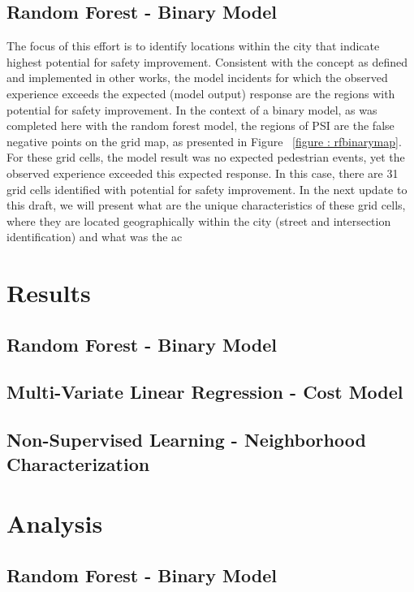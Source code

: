 \documentclass{llncs}
\begin{document}
\subsection{Random Forest - Binary Model}

The focus of this effort is to identify locations within the city that indicate highest potential for safety improvement. Consistent with the concept as defined and implemented in other works, the model incidents for which the observed experience exceeds the expected (model output) response are the regions with potential for safety improvement. In the context of a binary model, as was completed here with the random forest model, the regions of PSI are the false negative points on the grid map, as presented in Figure ~\ref{figure : rfbinarymap}. For these grid cells, the model result was no expected pedestrian events, yet the observed experience exceeded this expected response. In this case, there are 31 grid cells identified with potential for safety improvement. In the next update to this draft, we will present what are the unique characteristics of these grid cells, where they are located geographically within the city (street and intersection identification) and what was the ac
%
\section{Results}
%

\subsection{Random Forest - Binary Model}

\subsection{Multi-Variate Linear Regression - Cost Model}

\subsection{Non-Supervised Learning - Neighborhood Characterization}

%
\section{Analysis}
%

\subsection{Random Forest - Binary Model}
\end{document}
